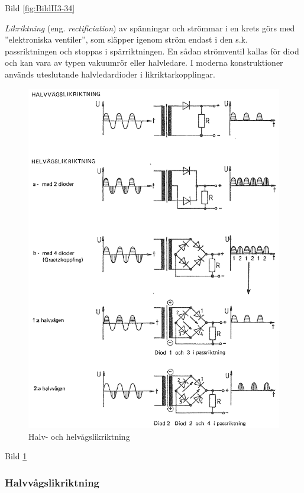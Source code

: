Bild \ref{fig:BildII3-34}

\emph{Likriktning} (eng. \emph{rectificiation}) av spänningar och strömmar i en
krets görs med ''elektroniska ventiler'', som släpper igenom ström endast i den
s.k. passriktningen och stoppas i spärriktningen. En sådan strömventil
kallas för diod och kan vara av typen vakuumrör eller halvledare. I
moderna konstruktioner används uteslutande halvledardioder i
likriktarkopplingar.

\begin{figure}
\includegraphics[width=\textwidth]{images/cropped_pdfs/bild_2_3-35.pdf}
\caption{Halv- och helvågslikriktning}
\label{fig:BildII3-35}
\end{figure}

Bild \ref{fig:BildII3-35}

\subsubsection{Halvvågslikriktning}

